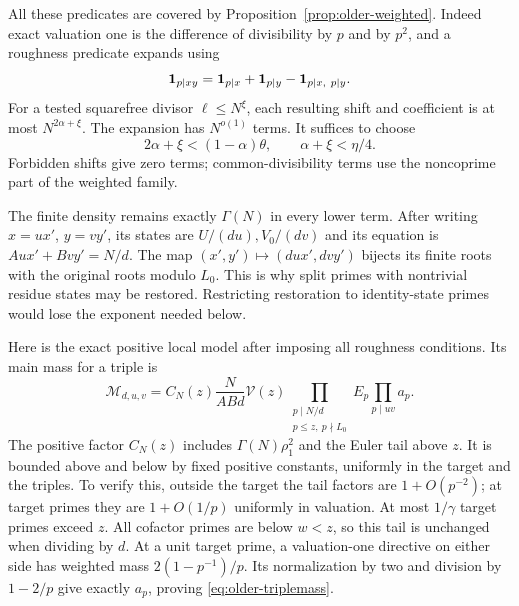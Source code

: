 All these predicates are covered by
Proposition~\ref{prop:older-weighted}.
Indeed exact valuation one is the difference of divisibility by
\(p\) and by \(p^2\), and a roughness predicate expands using
\[
 \mathbf 1_{p\mid xy}=\mathbf 1_{p\mid x}+\mathbf 1_{p\mid y}
                              -\mathbf 1_{p\mid x,\ p\mid y}.
\]
For a tested squarefree divisor \(\ell\le N^\xi\), each resulting
shift and coefficient is at most \(N^{2\alpha+\xi}\).
The expansion has \(N^{o(1)}\) terms.
It suffices to choose
\begin{equation}\label{eq:older-smallbudgets}
 2\alpha+\xi<(1-\alpha)\theta,\qquad
                         \alpha+\xi<\eta/4 .
\end{equation}
Forbidden shifts give zero terms; common-divisibility terms use the
noncoprime part of the weighted family.

The finite density remains exactly \(\Gamma(N)\) in every lower term.
After writing \(x=ux'\), \(y=vy'\), its states are
\(U/(du),V_0/(dv)\) and its equation is
\(Au x'+Bv y'=N/d\).
The map
\((x',y')\mapsto(du x',dv y')\) bijects its finite roots with the
original roots modulo \(L_0\).
This is why split primes with nontrivial residue states may be
restored.  Restricting restoration to identity-state primes would
lose the exponent needed below.

Here is the exact positive local model after imposing all roughness
conditions.  Its main mass for a triple is
\begin{equation}\label{eq:older-triplemass}
 \mathcal M_{d,u,v}
 =C_N(z)\frac{N}{ABd}\mathcal V(z)
       \prod_{\substack{p\mid N/d\\p\le z,\ p\nmid L_0}}E_p
       \prod_{p\mid uv}a_p .
\end{equation}
The positive factor \(C_N(z)\) includes \(\Gamma(N)\rho_1^2\)
and the Euler tail above \(z\).
It is bounded above and below by fixed positive constants,
uniformly in the target and the triples.
To verify this, outside the target the tail factors are
\(1+O(p^{-2})\); at target primes they are \(1+O(1/p)\) uniformly
in valuation.  At most \(1/\gamma\) target primes exceed \(z\).
All cofactor primes are below \(w<z\), so this tail is unchanged
when dividing by \(d\).
At a unit target prime, a valuation-one directive on either side
has weighted mass \(2(1-p^{-1})/p\).
Its normalization by two and division by \(1-2/p\) give exactly
\(a_p\), proving \eqref{eq:older-triplemass}.

